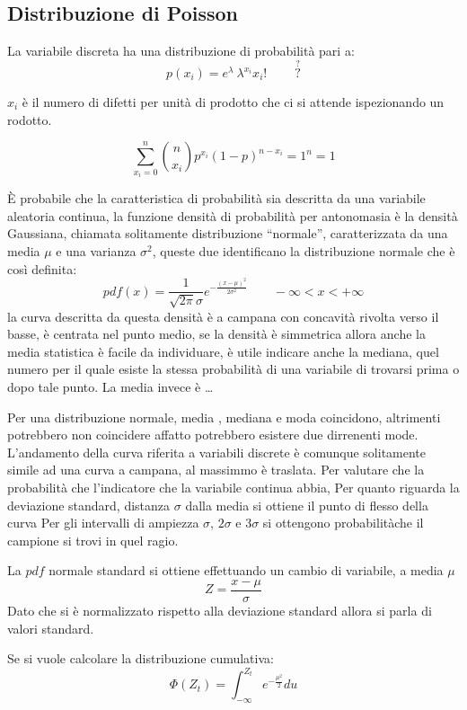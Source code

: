 \subsection{Distribuzione di Poisson}
La variabile discreta ha una distribuzione di probabilità pari a:
$$
p(x_i) = e^\lambda\ \lambda^{x_i}{x_i!}\ \qquad \stackrel{?}{?}
$$

$x_i$ è il numero di difetti per unità di prodotto che ci si attende ispezionando un rodotto.

$$
\sum_{x_i=0}^n \binom{n}{x_i} p^{x_i} (1-p)^{n-x_i} = 1^n = 1
$$

È probabile che la caratteristica di probabilità sia descritta da una variabile aleatoria continua, la funzione densità di probabilità per antonomasia è la densità Gaussiana, chiamata solitamente distribuzione ``normale'', caratterizzata da una media $\mu$ e una varianza $\sigma^2$, queste due identificano la distribuzione normale che è così definita:
$$
pdf(x) = \frac{1}{\sqrt{2\pi}\sigma}e^{-\frac{(x-\mu)^2}{2\sigma^2}} \qquad 
-\infty < x < + \infty
$$
la curva descritta da questa densità è a campana con concavità rivolta verso il basse, è centrata nel punto medio, se la densità è simmetrica allora anche la media statistica è facile da individuare, è utile indicare anche la mediana, quel numero per il quale esiste la stessa probabilità di una variabile di trovarsi prima o dopo tale punto.
La media invece è \dots

Per una distribuzione normale, media , mediana e moda coincidono, altrimenti potrebbero non coincidere affatto potrebbero esistere due dirrenenti mode.
L'andamento della curva riferita a variabili discrete è comunque solitamente simile ad una curva a campana, al massimmo è traslata.
Per valutare che la probabilità che l'indicatore che la variabile continua abbia, 
Per quanto riguarda la deviazione standard, distanza $\sigma$ dalla media si ottiene il punto di flesso della curva
Per gli intervalli di ampiezza $\sigma$, $2\sigma$ e $3\sigma$ si ottengono probabilitàche il campione si trovi in quel ragio.

La $pdf$ normale standard si ottiene effettuando un cambio di variabile, a media $\mu$
$$
Z = \frac{x-\mu}{\sigma}
$$
Dato che si è normalizzato rispetto alla deviazione standard allora si parla di valori standard.

Se si vuole calcolare la distribuzione cumulativa:
$$
\Phi(Z_t) = \int_{-\infty}^{Z_t} e^{-\frac{\mu^2}{2}}du
$$


